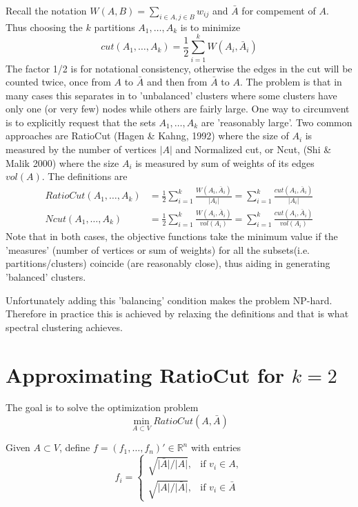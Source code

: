\documentclass[10pt,a4paper, nocenter]{report}
\begin{document}
	Recall the notation $W(A,B) = \sum_{i\in A, j\in B} w_{ij}$ and $\bar{A}$ for compement of $A$. Thus choosing the $k$ partitions $A_{1},\dots,A_{k}$ is to minimize $$ cut(A_{1},\dots,A_{k}) = \frac{1}{2}\sum_{i=1}^{k}W(A_{i},\bar{A}_{i}) $$ 
	The factor 1/2 is for notational consistency, otherwise the edges in the cut will be counted twice, once from $A$ to $\bar{A}$ and then from $\bar{A}$ to $A$. The problem is that in many cases this separates in to 'unbalanced' clusters where some clusters have only one (or very few) nodes while others are fairly large. One way to circumvent is to explicitly request that the sets $A_{1},\dots,A_{k}$ are 'reasonably large'. Two common approaches are RatioCut (Hagen \& Kahng, 1992) where the size of $A_{i}$ is measured by the number of vertices $\lvert A \rvert$ and Normalized cut, or Ncut, (Shi \& Malik 2000) where the size $A_{i}$ is measured by sum of weights of its edges $vol(A)$. The definitions are	
	\begin{align*}
		RatioCut(A_{1},\dots,A_{k}) &= \frac{1}{2} \sum_{i=1}^{k}\frac{W(A_{i},\bar{A}_{i})}{\lvert A_{i} \rvert}
		= \sum_{i=1}^{k}\frac{cut(A_{i},\bar{A}_{i})}{\lvert A_{i} \rvert} \\
		Ncut(A_{1},\dots,A_{k}) &= \frac{1}{2}\sum_{i=1}^{k}\frac{W(A_{i},\bar{A}_{i})}{vol(A_{i})} = 
		\sum_{i=1}^{k}\frac{cut(A_{i},\bar{A}_{i})}{vol(A_{i})}
	\end{align*}
	Note that in both cases, the objective functions take the minimum value if the 'measures' (number of vertices or sum of weights) for all the subsets(i.e. partitions/clusters) coincide (are reasonably close), thus aiding in generating 'balanced' clusters. 
	
	Unfortunately adding this 'balancing' condition makes the problem NP-hard. Therefore in practice this is achieved by relaxing the definitions and that is what spectral clustering achieves. 
	
	\section{Approximating RatioCut for $k=2$}
	The goal is to solve the optimization problem $$ \min_{A\subset V} RatioCut(A,\bar{A})$$
	
	Given $A\subset V$, define $f = (f_{1},\dots,f_{n})' \in \mathbb{R}^{n}$ with entries $$ f_{i} = \begin{cases}
	\sqrt{\lvert \bar{A} \rvert / \lvert A \rvert}, & \text{if }v_{i}\in A,\\
	\sqrt{\lvert A \rvert / \lvert \bar{A} \rvert}, & \text{if }v_{i}\in \bar{A}
	\end{cases}$$
	
\end{document}
